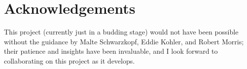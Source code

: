 \documentclass[letterpaper,twocolumn,10pt]{article}
\begin{document}
\section{Acknowledgements}
This project (currently just in a budding stage) would not have been possible without the guidance by Malte Schwarzkopf, Eddie Kohler, and Robert Morris; their patience and insights have been invaluable, and I look forward to collaborating on this project as it develops. 





\end{document}
